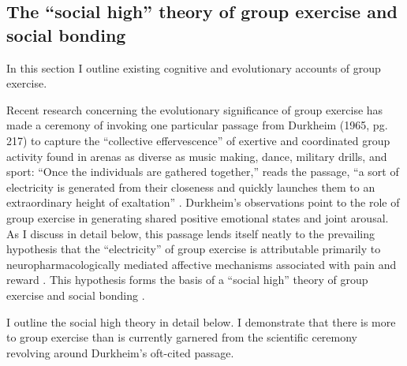 \begin{CJK}{UTF8}{gbsn}
\subsection{The ``social high'' theory of group exercise and social bonding\label{sect:socialHigh}}

In this section I outline existing cognitive and evolutionary accounts of group exercise.


Recent research concerning the evolutionary significance of group exercise has made a ceremony of invoking one particular passage from Durkheim (1965, pg. 217) to capture the ``collective effervescence'' of exertive and coordinated group activity found in arenas as diverse as music making, dance, military drills, and sport:
``Once the individuals are gathered together,'' reads the passage, ``a sort of electricity is generated from their closeness and quickly launches them to an extraordinary height of exaltation'' \citep{McNeill1995,Konvalinka2011,Fischer2014,Mogan2017}.  Durkheim's observations point to the role of group exercise in generating shared positive emotional states and joint arousal.  As I discuss in detail below, this passage lends itself neatly to the prevailing hypothesis that the ``electricity'' of group exercise is attributable primarily to neuropharmacologically mediated affective mechanisms associated with pain and reward \citep{Dunbar2008,Cohen2009,Fischer2014,Launay2016}.
This hypothesis forms the basis of a ``social high'' theory of group exercise and social bonding \citep[][hereafter simply ``social high theory'']{Cohen2017}.

I outline the social high theory in detail below.  I demonstrate that there is more to group exercise than is currently garnered from the scientific ceremony revolving around Durkheim's oft-cited passage.



\end{CJK}
